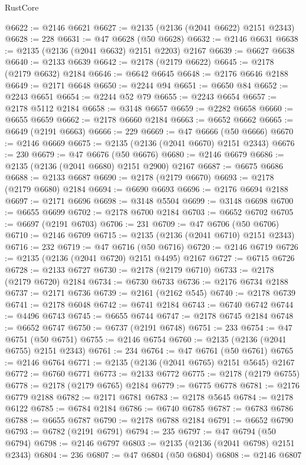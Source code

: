 \begin{lexlean}{RustCore}
\begin{coremodule}
@6622 := @2146 @6621
@6627 := @2135 (@2136 (@2041 @6622) @2151 @2343)
@6628 := 228
@6631 := @47 @6628 (@50 @6628)
@6632 := @2146 @6631
@6638 := @2135 (@2136 (@2041 @6632) @2151 @2203) @2167
@6639 := @6627 @6638
@6640 := @2133 @6639
@6642 := @2178 (@2179 @6622)
@6645 := @2178 (@2179 @6632) @2184
@6646 := @6642 @6645
@6648 := @2176 @6646 @2188
@6649 := @2171 @6648
@6650 := @2244 @94
@6651 := @6650 @84
@6652 := @2243 @6651
@6654 := @2244 @52 @79
@6655 := @2243 @6654
@6657 := @2178 @5112 @2184
@6658 := @3148 @6657
@6659 := @2282 @6658
@6660 := @6655 @6659
@6662 := @2178 @6660 @2184
@6663 := @6652 @6662
@6665 := @6649 (@2191 @6663)
@6666 := 229
@6669 := @47 @6666 (@50 @6666)
@6670 := @2146 @6669
@6675 := @2135 (@2136 (@2041 @6670) @2151 @2343)
@6676 := 230
@6679 := @47 @6676 (@50 @6676)
@6680 := @2146 @6679
@6686 := @2135 (@2136 (@2041 @6680) @2151 @2900) @2167
@6687 := @6675 @6686
@6688 := @2133 @6687
@6690 := @2178 (@2179 @6670)
@6693 := @2178 (@2179 @6680) @2184
@6694 := @6690 @6693
@6696 := @2176 @6694 @2188
@6697 := @2171 @6696
@6698 := @3148 @5504
@6699 := @3148 @6698
@6700 := @6655 @6699
@6702 := @2178 @6700 @2184
@6703 := @6652 @6702
@6705 := @6697 (@2191 @6703)
@6706 := 231
@6709 := @47 @6706 (@50 @6706)
@6710 := @2146 @6709
@6715 := @2135 (@2136 (@2041 @6710) @2151 @2343)
@6716 := 232
@6719 := @47 @6716 (@50 @6716)
@6720 := @2146 @6719
@6726 := @2135 (@2136 (@2041 @6720) @2151 @4495) @2167
@6727 := @6715 @6726
@6728 := @2133 @6727
@6730 := @2178 (@2179 @6710)
@6733 := @2178 (@2179 @6720) @2184
@6734 := @6730 @6733
@6736 := @2176 @6734 @2188
@6737 := @2171 @6736
@6739 := @2161 (@2162 @545)
@6740 := @2178 @6739
@6741 := @2178 @6048
@6742 := @6741 @2184
@6743 := @6740 @6742
@6744 := @4496 @6743
@6745 := @6655 @6744
@6747 := @2178 @6745 @2184
@6748 := @6652 @6747
@6750 := @6737 (@2191 @6748)
@6751 := 233
@6754 := @47 @6751 (@50 @6751)
@6755 := @2146 @6754
@6760 := @2135 (@2136 (@2041 @6755) @2151 @2343)
@6761 := 234
@6764 := @47 @6761 (@50 @6761)
@6765 := @2146 @6764
@6771 := @2135 (@2136 (@2041 @6765) @2151 @5645) @2167
@6772 := @6760 @6771
@6773 := @2133 @6772
@6775 := @2178 (@2179 @6755)
@6778 := @2178 (@2179 @6765) @2184
@6779 := @6775 @6778
@6781 := @2176 @6779 @2188
@6782 := @2171 @6781
@6783 := @2178 @5645
@6784 := @2178 @6122
@6785 := @6784 @2184
@6786 := @6740 @6785
@6787 := @6783 @6786
@6788 := @6655 @6787
@6790 := @2178 @6788 @2184
@6791 := @6652 @6790
@6793 := @6782 (@2191 @6791)
@6794 := 235
@6797 := @47 @6794 (@50 @6794)
@6798 := @2146 @6797
@6803 := @2135 (@2136 (@2041 @6798) @2151 @2343)
@6804 := 236
@6807 := @47 @6804 (@50 @6804)
@6808 := @2146 @6807

\end{coremodule}
\end{lexlean}
